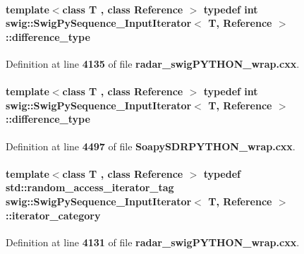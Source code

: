 \paragraph[{difference\+\_\+type}]{\setlength{\rightskip}{0pt plus 5cm}template$<$class T , class Reference $>$ typedef {\bf int} {\bf swig\+::\+Swig\+Py\+Sequence\+\_\+\+Input\+Iterator}$<$ T, Reference $>$\+::{\bf difference\+\_\+type}}\label{structswig_1_1SwigPySequence__InputIterator_af5e5d3f2d1906ceaf05c2215ee388096}


Definition at line {\bf 4135} of file {\bf radar\+\_\+swig\+P\+Y\+T\+H\+O\+N\+\_\+wrap.\+cxx}.

\paragraph[{difference\+\_\+type}]{\setlength{\rightskip}{0pt plus 5cm}template$<$class T , class Reference $>$ typedef {\bf int} {\bf swig\+::\+Swig\+Py\+Sequence\+\_\+\+Input\+Iterator}$<$ T, Reference $>$\+::{\bf difference\+\_\+type}}\label{structswig_1_1SwigPySequence__InputIterator_af5e5d3f2d1906ceaf05c2215ee388096}


Definition at line {\bf 4497} of file {\bf Soapy\+S\+D\+R\+P\+Y\+T\+H\+O\+N\+\_\+wrap.\+cxx}.

\paragraph[{iterator\+\_\+category}]{\setlength{\rightskip}{0pt plus 5cm}template$<$class T , class Reference $>$ typedef std\+::random\+\_\+access\+\_\+iterator\+\_\+tag {\bf swig\+::\+Swig\+Py\+Sequence\+\_\+\+Input\+Iterator}$<$ T, Reference $>$\+::{\bf iterator\+\_\+category}}\label{structswig_1_1SwigPySequence__InputIterator_a39f1b5afee549aeb2f87c854c41be9c1}


Definition at line {\bf 4131} of file {\bf radar\+\_\+swig\+P\+Y\+T\+H\+O\+N\+\_\+wrap.\+cxx}.

